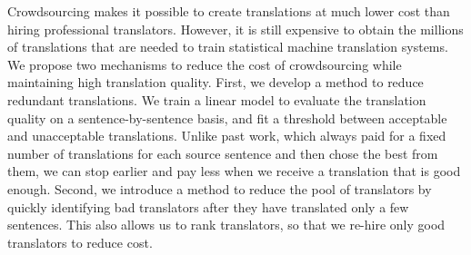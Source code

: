 Crowdsourcing makes it possible to create translations at much lower cost than hiring professional translators. However, it is still expensive to obtain the millions of translations that are needed to train statistical machine translation systems. We propose two mechanisms to reduce the cost of crowdsourcing while maintaining high translation quality. First, we develop a method to reduce redundant translations. We train a linear model to evaluate the translation quality on a sentence-by-sentence basis, and fit a threshold between acceptable and unacceptable translations. Unlike past work, which always paid for a fixed number of translations for each source sentence and then chose the best from them, we can stop earlier and pay less when we receive a translation that is good enough. Second, we introduce a method to reduce the pool of translators by quickly identifying bad translators after they have translated only a few sentences. This also allows us to rank translators, so that we re-hire only good translators to reduce cost.
